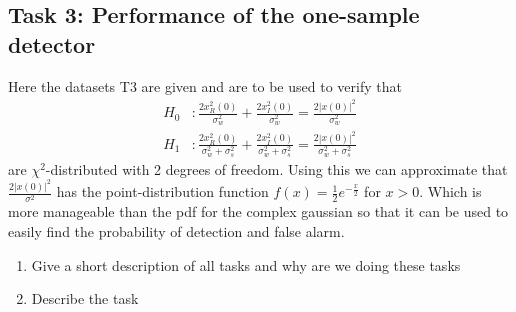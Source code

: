\subsection{Task 3: Performance of the one-sample detector}
Here the datasets T3 are given and are to be used to verify that
\begin{align}
	H_0 &: \frac{2x_R^2(0)}{\sigma_w^2}+\frac{2x_I^2(0)}{\sigma_w^2}=\frac{2|x(0)|^2}{\sigma_w^2}\label{eq:chi_sq_h0}\\
	H_1 &: \frac{2x_R^2(0)}{\sigma_w^2+\sigma_s^2}+\frac{2x_I^2(0)}{\sigma_w^2+\sigma_s^2}=\frac{2|x(0)|^2}{\sigma_w^2+\sigma_s^2}\label{eq:chi_sq_h1}
\end{align}
are $\chi^2$-distributed with 2 degrees of freedom. Using this we can approximate that $\frac{2|x(0)|^2}{\sigma^2}$ has the point-distribution function $f(x) = \frac{1}{2}e^{-\frac{x}{2}}$ for $x>0$. Which is more manageable than the pdf for the complex gaussian so that it can be used to easily find the probability of detection and false alarm.

\begin{enumerate}[i]
	\item Give a short description of all tasks and why are we doing these tasks
	\item Describe the task
\end{enumerate}